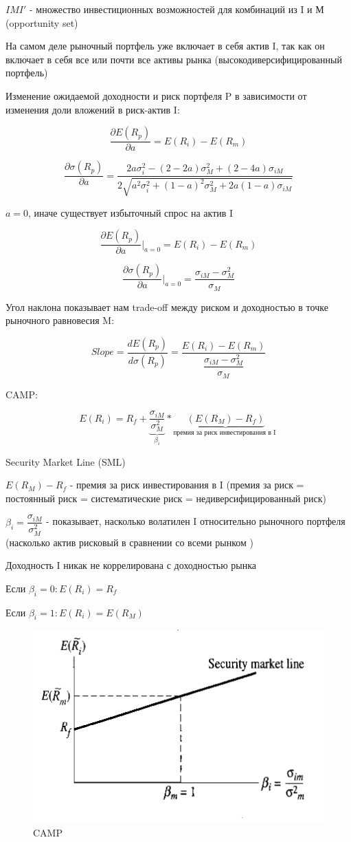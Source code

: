 \documentclass[a4paper,12pt]{article} %
\begin{document}
$ IMI' $ - множество инвестиционных возможностей для комбинаций из I и М (opportunity set) 

На самом деле рыночный портфель уже включает в себя актив I, так как он включает в себя все или почти все активы рынка (высокодиверсифицированный портфель)

 Изменение ожидаемой доходности и риск портфеля P в зависимости от изменения доли вложений в риск-актив I: 
 
 \[  \dfrac{\partial E({R}_p)}{\partial a} =  E(R_i) - E(R_m) \]
 
 \[   \dfrac{\partial\sigma({R}_p)}{\partial a} = \dfrac{2a \sigma^2_{i} - (2-2a) \sigma^2_{M}  + (2-4a) \sigma_{iM} }{2\sqrt{a^2 \sigma^2_{i} + (1-a)^2 \sigma^2_{M}  + 2a(1-a) \sigma_{iM}}} \]
 
 
 $ a = 0 $, иначе существует избыточный спрос на актив I 
 
  \[   \dfrac{\partial E({R}_p) }{\partial a} \Big| _{a=0}  =  E(R_i) - E(R_m) \]
 
  \[   \dfrac{\partial\sigma({R}_p)}{\partial a} \Big| _{a=0}  = \dfrac{  \sigma_{iM} -  \sigma^2_{M}  }{\sigma_{M}  } \]
 
 
 
  Угол наклона  показывает нам  trade-off  между риском и доходностью в точке рыночного равновесия M:
  
  \[ 
  Slope =
  \dfrac{d E(R_p)}{d \sigma (R_p) } = \dfrac{E(R_i) - E(R_m) }{\dfrac{  \sigma_{iM} -  \sigma^2_{M}  }{\sigma_{M}  } } \]
  
  CAMP:
  
 \[  E(R_i) = R_f + \underbrace{\dfrac{ \sigma_{iM}}{\sigma^2_{M}}}_{\beta_i} * \underbrace{(E(R_M ) - R_f)}_{\text{премия за риск инвестирования в I }}    
  \]

 Security Market Line (SML)
 
 $ E(R_M ) - R_f $
 -  премия за риск инвестирования в I
 (премия  за риск = постоянный риск =  систематические риск = недиверсифицированный  риск) 
 
 $  \beta_i = \dfrac{ \sigma_{iM}}{\sigma^2_{M}} $  - показывает, насколько волатилен  I относительно рыночного портфеля  (насколько актив рисковый в сравнении со всеми рынком )

Доходность I никак не коррелирована  с доходностью рынка
 
 Если $ \beta_i = 0:  E(R_i ) = R_f  $
  
Если $ \beta_i = 1:  E(R_i ) = E(R_M )  $
  
  
  \begin{figure}[h!]
  	\centering
  	\includegraphics[width=0.6\linewidth]{screenshot016}
  	\caption{CAMP}
  	\label{fig:screenshot016}
  \end{figure}
  
\end{document}
